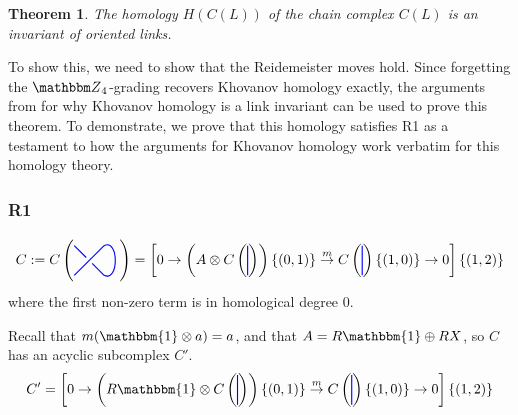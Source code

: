\documentclass{amsart}
\newcommand{\hackcenter}[1]{
 \xy (0,0)*{#1}; \endxy}
\theoremstyle{plain}
\newtheorem{theorem}{Theorem}
\theoremstyle{definition}
\theoremstyle{definition}
\numberwithin{equation}{section}
\numberwithin{theorem}{section}
\renewcommand{\to}{\rightarrow}
\numberwithin{equation}{section}
\def\Z{{\mathbbm Z}}
\def\1{\mathbbm{1}}%
\begin{document}
\begin{theorem}\label{homology-link-invariant}
  The homology $H(C(L))$ of the chain complex $C(L)$ is an invariant of oriented links.
\end{theorem}

To show this, we need to show that the Reidemeister moves hold.
Since forgetting the $\Z_4$-grading recovers Khovanov homology exactly, the arguments from \cite{BN1} for why Khovanov homology is a link invariant can be used to prove this theorem.
To demonstrate, we prove that this homology satisfies R1 as a testament to how the arguments for Khovanov homology work verbatim for this homology theory.

\subsubsection{R1}
\[
C:=C
\left(
\hackcenter{ \begin{tikzpicture} [scale=.75]
\draw[thick,   blue] (0,0) to (1,1);
\draw[thick,   blue] (1,0) to (.6,.4);
\draw[thick,   blue] (0,1) to (.4,.6);
\draw[thick, blue] (1,1) .. controls ++(.5,.25) and ++(.5, -.25) ..(1,0);
\end{tikzpicture}}
\right)=\left[0\to
 \left(A\otimes C\left(
\hackcenter{ \begin{tikzpicture} [scale=.75]
\draw[thick,   blue] (0,0) to (0,1);
\end{tikzpicture}}\right)
\right)\{(0,1)\} \overset{m}{\to}
C\left(
\hackcenter{ \begin{tikzpicture} [scale=.75]
\draw[thick,   blue] (0,0) to (0,1);
\end{tikzpicture}}\right)
\{(1,0)\}
\to 0 \right]\{(1,2)\}
\]
where the first non-zero term is in homological degree 0.

Recall that $m(\1 \otimes a)=a$, and that $A=R\1 \oplus R X$, so $C$ has an acyclic subcomplex $C'$.
\[
C'=
\left[0\to
\left(R \1 \otimes C\left(
\hackcenter{ \begin{tikzpicture} [scale=.75]
\draw[thick,   blue] (0,0) to (0,1);
\end{tikzpicture}}\right)
\right)\{(0,1)\} \overset{m}{\to}
C\left(
\hackcenter{ \begin{tikzpicture} [scale=.75]
\draw[thick,   blue] (0,0) to (0,1);
\end{tikzpicture}}\right)
\{(1,0)\}
\to 0
\right]\{(1,2)\}
\]
\end{document}
